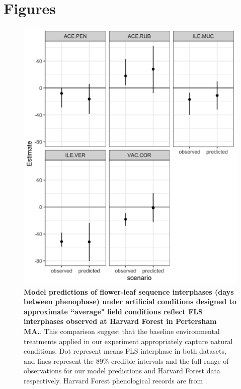 \documentclass{article}\usepackage[]{graphicx}\usepackage[]{color}
\begin{document}
\pagebreak[4]

\section*{Figures}

 \begin{figure}[!ht]
    \centering
 \includegraphics[width=\textwidth]{..//Plots/fieldmodcomparisions.jpeg}
    \caption{\textbf{Model predictions of flower-leaf sequence interphases (days between phenophase) under artificial conditions designed to approximate ``average" field conditions reflect FLS interphases observed at Harvard Forest in Pertersham MA.}. This comparison suggest that the baseline environmental treatments  applied in our experiment appropriately capture natural conditions. Dot represent means FLS interphase in both datasets, and lines represent the 89\% credible intervals and the full range of observations for our model predictions and Harvard Forest data respectively.  Harvard Forest phenological records are from \citet{Okeefe2015}.}
    \label{fig:validate}
\end{figure}
\end{document}

